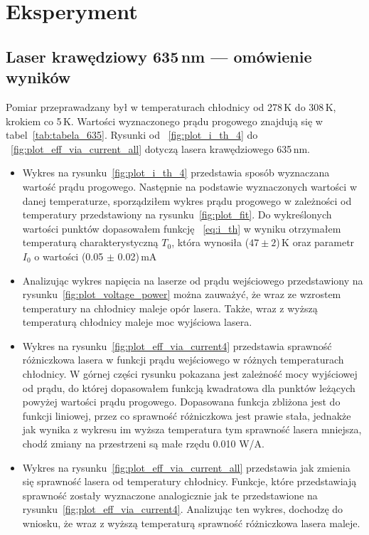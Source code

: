 \section{Eksperyment}
\subsection{Laser krawędziowy 635\,nm --- omówienie wyników}
Pomiar przeprawadzany był w temperaturach chłodnicy od 278\,K do 308\,K, krokiem co 5\,K. Wartości wyznaczonego prądu progowego
znajdują się w tabel~\ref{tab:tabela_635}. Rysunki od ~\ref{fig:plot_i_th_4} do ~\ref{fig:plot_eff_via_current_all} dotyczą lasera
krawędziowego 635\,nm.
\begin{itemize}
\item Wykres na rysunku~\ref{fig:plot_i_th_4} przedstawia sposób wyznaczana wartość prądu progowego. Następnie na podstawie
wyznaczonych wartości w danej temperaturze, sporządziłem wykres prądu progowego w zależności od temperatury
przedstawiony na rysunku~\ref{fig:plot_fit}. Do wykreślonych wartości punktów dopasowałem funkcję ~\ref{eq:i_th} w wyniku otrzymałem
 temperaturą charakterystyczną $T_0$, która wynosiła ($47 \pm 2$)\,K oraz parametr $I_0$ o wartości (0.05 $\pm$ 0.02)\,mA
\item Analizując wykres napięcia na laserze od prądu wejściowego przedstawiony na rysunku~\ref{fig:plot_voltage_power}
można zauważyć, że wraz ze wzrostem temperatury na chłodnicy
maleje opór lasera. Także, wraz z wyższą temperaturą chłodnicy maleje moc wyjściowa lasera.
\item Wykres na rysunku~\ref{fig:plot_eff_via_current4} przedstawia sprawność różniczkowa lasera w funkcji prądu wejściowego
w różnych temperaturach chłodnicy. W górnej części rysunku pokazana jest zależność mocy wyjściowej od prądu, do której dopasowałem
funkcją kwadratowa dla punktów leżących powyżej wartości prądu progowego. Dopasowana funkcja zbliżona jest do funkcji liniowej, przez co sprawność różniczkowa jest
prawie stała, jednakże jak wynika z wykresu im wyższa temperatura tym sprawność lasera mniejsza, chodź zmiany na
przestrzeni są małe rzędu 0.010 W/A.
\item Wykres na rysunku~\ref{fig:plot_eff_via_current_all} przedstawia jak zmienia się sprawność lasera od temperatury chłodnicy.
Funkcje, które przedstawiają sprawność zostały wyznaczone analogicznie jak te przedstawione na rysunku~\ref{fig:plot_eff_via_current4}.
Analizując ten wykres, dochodzę do wniosku, że wraz z wyższą temperaturą sprawność różniczkowa lasera maleje.
\end{itemize}
